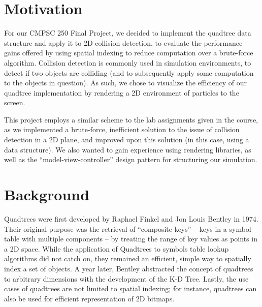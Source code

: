 
\usepackage{amsmath}
\usepackage{setspace}
\usepackage{amssymb}
\usepackage{amsthm}
\usepackage{listings}
\usepackage{tikz}
\usepackage{csvsimple}
\usepackage{minted}
\usepackage{fancyvrb}
\usepackage{multicol}
\setlength{\parindent}{0pt}

\lstset{breaklines=true, showstringspaces=false,
    basicstyle=\footnotesize\ttfamily
}


\doublespacing

\MYHEADERS
{}

    \section{Motivation}
      For our CMPSC 250 Final Project, we decided to implement the
      quadtree data structure and apply it to 2D collision detection, to
      evaluate the performance gains offered by using spatial indexing
      to reduce computation over a brute-force algorithm. Collision
      detection is commonly used in simulation environments, to detect
      if two objects are colliding (and to subsequently apply some
      computation to the objects in question). As such, we chose to
      visualize the efficiency of our quadtree implementation by
      rendering a 2D environment of particles to the screen.
      \par This project employs a similar scheme to the lab assignments
      given in the course, as we implemented a brute-force, inefficient
      solution to the issue of collision detection in a 2D plane, and
      improved upon this solution (in this case, using a data
      structure). We also wanted to gain experience using rendering
      libraries, as well as the “model-view-controller” design pattern
      for structuring our simulation.

    \section{Background}
      Quadtrees were first developed by Raphael Finkel and Jon Louis
      Bentley in 1974. Their original purpose was the retrieval of
      “composite keys” -- keys in a symbol table with multiple
      components -- by treating the range of key values as points in a
      2D space. While the application of Quadtrees to symbols table
      lookup algorithms did not catch on, they remained an efficient,
      simple way to spatially index a set of objects. A year later,
      Bentley abstracted the concept of quadtrees to arbitrary
      dimensions with the development of the K-D Tree. Lastly, the use
      cases of quadtrees are not limited to spatial indexing; for
      instance, quadtrees can also be used for efficient representation
      of 2D bitmaps.

